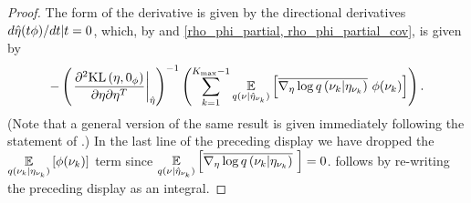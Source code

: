 \begin{thm}
\begin{proof}
The form of the derivative is given by the directional derivatives $d \hat\eta(t
\phi) / dt | t = 0$, which, by  and \eqref{rho_phi_partial,
rho_phi_partial_cov}, is given by
%
\begin{align*}
%
-\left(\fracat{\partial^2 \KL{\eta, \phiz}}
                {\partial \eta \partial \eta^T}
                {\etaopt}\right)^{-1}
\left(
    \sumkm \expect{\q(\nu \vert \etaoptnuk)}
                  {\lqgradbar{\nuk \vert \etanuk}
                   \phi(\nuk) }
\right).
%
\end{align*}
%
(Note that a general version of the same result is given immediately following
the statement of \citet[Theorem 4.B(c)]{zeidler:2013:functional}.)  In the last
line of the preceding display we have dropped the $\underset{q(\nu_{k} \vert
\eta_{\nu_{k}})}{\mathbb{E}}\left[\phi(\nu_{k})\right]$ term since $\underset{q(\nu \vert \hat\eta_{\nu_{k}})}{\mathbb{E}}\left[\overline{{\nabla_\eta \log q}\left(\nu_{k} \vert \eta_{\nu_{k}}\right)}\,\,\right] = 0$.   follows by
re-writing the preceding display as an integral.
%
\end{proof}
%
\end{thm}
%
